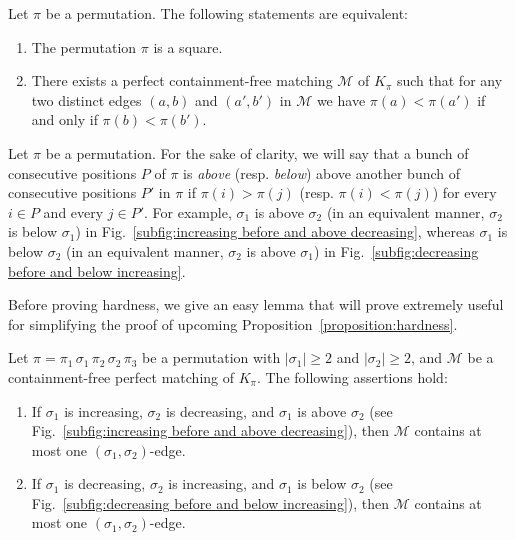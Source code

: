 \documentclass[a4paper]{llncs}
\begin{document}
\begin{lemma}
  \label{lemma:matching}
  Let $\pi$ be a permutation. The following statements are equivalent:
  \begin{enumerate}
    \item The permutation $\pi$ is a square.
    \item There exists a perfect containment-free matching $\mathcal{M}$
    of $K_\pi$ such that for any two distinct edges $(a, b)$ and
    $(a', b')$ in $\mathcal{M}$ we have $\pi(a) < \pi(a')$ if and only
    if $\pi(b) < \pi(b')$.
  \end{enumerate}
\end{lemma}

Let $\pi$ be a permutation. For the sake of clarity, we will say that a
bunch of consecutive positions $P$ of $\pi$ is \emph{above} (resp.
\emph{below}) above another bunch of consecutive positions $P'$ in $\pi$
if $\pi(i) > \pi(j)$ (resp. $\pi(i) < \pi(j)$) for every $i \in P$ and
every $j \in P'$. For example, $\sigma_1$ is above $\sigma_2$ (in an
equivalent manner, $\sigma_2$ is below $\sigma_1$) in
Fig.~\ref{subfig:increasing before and above decreasing}, whereas
$\sigma_1$ is below $\sigma_2$ (in an equivalent manner, $\sigma_2$ is
above $\sigma_1$) in Fig.~\ref{subfig:decreasing before and below
increasing}.

Before proving hardness, we give an easy lemma that will prove extremely
useful for simplifying the proof of upcoming
Proposition~\ref{proposition:hardness}.

\begin{lemma}
  \label{lemma:at most one edge monotone}
  Let $\pi = \pi_1 \, \sigma_1 \, \pi_2 \, \sigma_2 \, \pi_3$
  be a permutation with $|\sigma_1| \geq 2$ and $|\sigma_2| \geq 2$,
  and $\mathcal{M}$ be a containment-free perfect matching of $K_\pi$.
  The following assertions hold:
  \begin{enumerate}
    \item
    If $\sigma_1$ is increasing, $\sigma_2$ is decreasing, and
    $\sigma_1$ is above $\sigma_2$ (see Fig.~\ref{subfig:increasing before
    and above decreasing}), then $\mathcal{M}$ contains at most one
    $(\sigma_1, \sigma_2)$-edge.
    \item
    If $\sigma_1$ is decreasing, $\sigma_2$ is increasing, and $\sigma_1$
    is below $\sigma_2$ (see Fig.~\ref{subfig:decreasing before and below
    increasing}), then $\mathcal{M}$ contains at most one
    $(\sigma_1, \sigma_2)$-edge.
  \end{enumerate}
\end{lemma}
\end{document}
